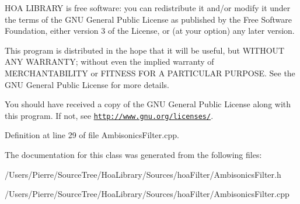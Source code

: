 H\-O\-A L\-I\-B\-R\-A\-R\-Y is free software\-: you can redistribute it and/or modify it under the terms of the G\-N\-U General Public License as published by the Free Software Foundation, either version 3 of the License, or (at your option) any later version.

This program is distributed in the hope that it will be useful, but W\-I\-T\-H\-O\-U\-T A\-N\-Y W\-A\-R\-R\-A\-N\-T\-Y; without even the implied warranty of M\-E\-R\-C\-H\-A\-N\-T\-A\-B\-I\-L\-I\-T\-Y or F\-I\-T\-N\-E\-S\-S F\-O\-R A P\-A\-R\-T\-I\-C\-U\-L\-A\-R P\-U\-R\-P\-O\-S\-E. See the G\-N\-U General Public License for more details.

You should have received a copy of the G\-N\-U General Public License along with this program. If not, see \href{http://www.gnu.org/licenses/}{\tt http\-://www.\-gnu.\-org/licenses/}. 

Definition at line 29 of file Ambisonics\-Filter.\-cpp.



The documentation for this class was generated from the following files\-:\begin{DoxyCompactItemize}
\item 
/\-Users/\-Pierre/\-Source\-Tree/\-Hoa\-Library/\-Sources/hoa\-Filter/Ambisonics\-Filter.\-h\item 
/\-Users/\-Pierre/\-Source\-Tree/\-Hoa\-Library/\-Sources/hoa\-Filter/Ambisonics\-Filter.\-cpp\end{DoxyCompactItemize}
